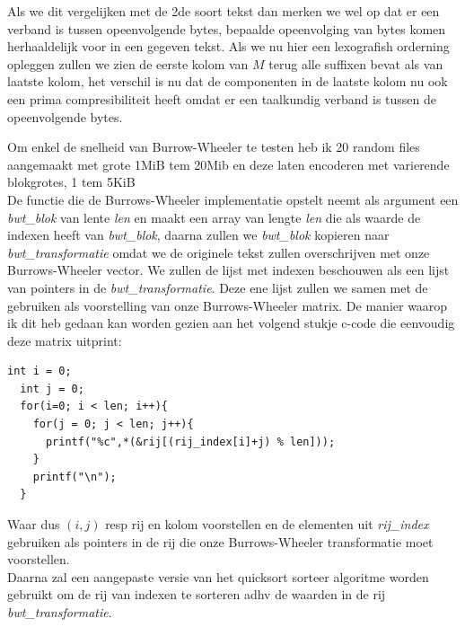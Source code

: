 \documentclass[10pt,a4paper]{report}
\begin{document}
Als we dit vergelijken met de 2de soort tekst dan merken we wel op dat er een verband is tussen opeenvolgende bytes, bepaalde opeenvolging van bytes komen herhaaldelijk voor in een gegeven tekst. Als we nu hier een lexografish orderning opleggen zullen we zien de eerste kolom van $M$ terug alle suffixen bevat als van laatste kolom, het verschil is nu dat de componenten in de laatste kolom nu ook een prima compresibiliteit heeft omdat er een taalkundig verband is tussen de opeenvolgende bytes.

Om enkel de snelheid van Burrow-Wheeler te testen heb ik 20 random files aangemaakt met grote 1MiB tem 20Mib en deze laten encoderen met varierende blokgrotes, 1 tem 5KiB\\

De functie die de Burrows-Wheeler implementatie opstelt neemt als argument een \emph{bwt\_blok} van lente \emph{len} en maakt een array van lengte \emph{len} die als waarde de indexen heeft van \emph{bwt\_blok}, daarna zullen we \emph{bwt\_blok} kopieren naar \emph{bwt\_transformatie} omdat we de originele tekst zullen overschrijven met onze Burrows-Wheeler vector. We zullen de lijst met indexen beschouwen als een lijst van pointers in de \emph{bwt\_transformatie}. Deze ene lijst zullen we samen met de gebruiken als voorstelling van onze Burrows-Wheeler matrix. De manier waarop ik dit heb gedaan kan worden gezien aan het volgend stukje c-code die eenvoudig deze matrix uitprint:

\begin{lstlisting}
int i = 0;
  int j = 0;
  for(i=0; i < len; i++){
    for(j = 0; j < len; j++){
      printf("%c",*(&rij[(rij_index[i]+j) % len]));
    }
    printf("\n");
  }
\end{lstlisting}
Waar dus $(i,j)$ resp rij en kolom voorstellen en de elementen uit \emph{rij\_index} gebruiken als pointers in de rij die onze Burrows-Wheeler transformatie moet voorstellen. \\

Daarna zal een aangepaste versie van het quicksort sorteer algoritme worden gebruikt om de rij van indexen te sorteren adhv de waarden in de rij \emph{bwt\_transformatie}.\\
\end{document}
